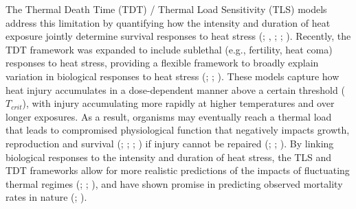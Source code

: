 \documentclass[
  11pt,
]{article}
\begin{document}
The Thermal Death Time (TDT) / Thermal Load Sensitivity (TLS) models
address this limitation by quantifying how the intensity and duration of
heat exposure jointly determine survival responses to heat stress
(;
,
;
;
).
Recently, the TDT framework was expanded to include sublethal (e.g.,
fertility, heat coma) responses to heat stress, providing a flexible
framework to broadly explain variation in biological responses to heat
stress (;
;
). These
models capture how heat injury accumulates in a dose-dependent manner
above a certain threshold (\(T_{crit}\)), with injury accumulating more
rapidly at higher temperatures and over longer exposures. As a result,
organisms may eventually reach a thermal load that leads to compromised
physiological function that negatively impacts growth, reproduction and
survival (;
;
;
) if
injury cannot be repaired (; ; ). By linking biological responses to the intensity and
duration of heat stress, the TLS and TDT frameworks allow for more
realistic predictions of the impacts of fluctuating thermal regimes
(;
;
), and
have shown promise in predicting observed mortality rates in nature
(; ).
\end{document}
